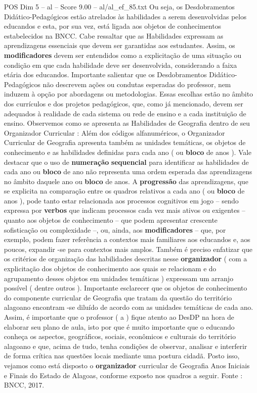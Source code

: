 \begin{textsample}{POS Dim 5 – al – Score 9.00 – al/al\_ef\_85.txt}
Ou seja, os Desdobramentos Didático-Pedagógicos estão atrelados às habilidades a serem desenvolvidas pelos educandos e esta, por sua vez, está ligada aos objetos de conhecimentos estabelecidos na BNCC.
Cabe ressaltar que as Habilidades expressam as aprendizagens essenciais que devem ser garantidas aos estudantes.
Assim, os \textbf{modificadores} devem ser entendidos como a explicitação de uma situação ou condição em que cada habilidade deve ser desenvolvida, considerando a faixa etária dos educandos.
Importante salientar que os Desdobramentos Didático-Pedagógicos não descrevem ações ou condutas esperadas do professor, nem induzem à opção por abordagens ou metodologias.
Essas escolhas estão no âmbito dos currículos e dos projetos pedagógicos, que, como já mencionado, devem ser adequados à realidade de cada sistema ou rede de ensino e a cada instituição de ensino.
Observemos como se apresenta as Habilidades de Geografia dentro de seu Organizador Curricular : Além dos códigos alfanuméricos, o Organizador Curricular de Geografia apresenta também as unidades temáticas, os objetos de conhecimento e as habilidades definidas para cada ano ( ou \textbf{bloco} de anos ).
Vale destacar que o uso de \textbf{numeração} \textbf{sequencial} para identificar as habilidades de cada ano ou \textbf{bloco} de ano não representa uma ordem esperada das aprendizagens no âmbito daquele ano ou \textbf{bloco} de anos.
A \textbf{progressão} das aprendizagens, que se explicita na comparação entre os quadros relativos a cada ano ( ou \textbf{bloco} de anos ), pode tanto estar relacionada aos processos cognitivos em jogo – sendo expressa por \textbf{verbos} que indicam processos cada vez mais ativos ou exigentes – quanto aos objetos de conhecimento – que podem apresentar crescente sofisticação ou complexidade –, ou, ainda, aos \textbf{modificadores} – que, por exemplo, podem fazer referência a contextos mais familiares aos educandos e, aos poucos, expandir -se para contextos mais amplos.
Também é preciso enfatizar que os critérios de organização das habilidades descritas nesse \textbf{organizador} ( com a explicitação dos objetos de conhecimento aos quais se relacionam e do agrupamento desses objetos em unidades temáticas ) expressam um arranjo possível ( dentre outros ).
Importante esclarecer que os objetos de conhecimento do componente curricular de Geografia que tratam da questão do território alagoano encontram -se diluído de acordo com as unidades temáticas de cada ano.
Assim, é importante que o professor ( a ) fique atento ao DesDP na hora de elaborar seu plano de aula, isto por que é muito importante que o educando conheça os aspectos, geográficos, sociais, econômicos e culturais do território alagoano e que, acima de tudo, tenha condições de observar, analisar e interferir de forma crítica nas questões locais mediante uma postura cidadã.
Posto isso, vejamos como está disposto o \textbf{organizador} curricular de Geografia Anos Iniciais e Finais do Estado de Alagoas, conforme exposto nos quadros a seguir.
Fonte : BNCC, 2017.

\end{textsample}
